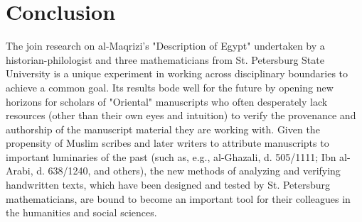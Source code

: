 \documentclass[conference,a4paper,twocolumn]{IEEEtran}
\begin{document}
\section{Conclusion}

The join research on al-Maqrizi’s "Description of Egypt" undertaken by a historian-philologist and three mathematicians from St. Petersburg State University is a unique experiment in working across disciplinary boundaries to achieve a common goal. Its results bode well for the future by opening new horizons for scholars of "Oriental" manuscripts who often desperately lack resources (other than their own eyes and intuition) to verify the provenance and authorship of the manuscript material they are working with. Given the propensity of Muslim scribes and later writers to attribute manuscripts to important luminaries of the past (such as, e.g., al-Ghazali, d. 505/1111; Ibn al-Arabi, d. 638/1240, and others), the new methods of analyzing and verifying handwritten texts, which have been designed and tested by St. Petersburg mathematicians, are bound to become an important tool for their colleagues in the humanities and social sciences.


%
%
%
\end{document}
